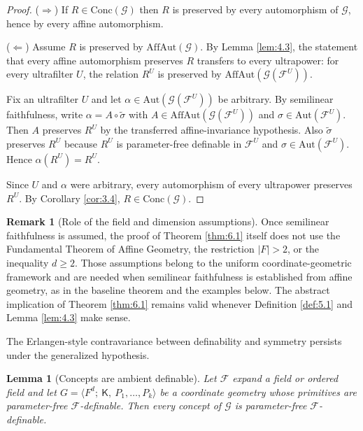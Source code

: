 \documentclass[11pt,a4paper]{article}
\newcommand{\G}{\mathcal{G}}
\newcommand{\F}{\mathcal{F}}
\newtheorem{lemma}[theorem]{Lemma}
\theoremstyle{definition}
\newtheorem{remark}[theorem]{Remark}
\begin{document}
\begin{proof}
($\Rightarrow$) If $R\in \mathrm{Conc}(\G)$ then $R$
is preserved by every automorphism of $\G$, hence by every affine
automorphism.

($\Leftarrow$) Assume $R$ is preserved by $\mathrm{AffAut}(\G)$. By
Lemma \ref{lem:4.3}, the statement that every affine automorphism preserves $R$
transfers to every ultrapower: for every ultrafilter $U$, the relation
$R^U$ is preserved by $\mathrm{AffAut}(\G(\F^U))$.

Fix an ultrafilter $U$ and let
$\alpha\in \mathrm{Aut}(\G(\F^U))$ be arbitrary. By semilinear
faithfulness, write $\alpha=A\circ \widetilde\sigma$ with
$A\in \mathrm{AffAut}(\G(\F^U))$ and
$\sigma\in \mathrm{Aut}(\F^U)$. Then $A$ preserves $R^U$
by the transferred affine-invariance hypothesis. Also
$\widetilde\sigma$ preserves $R^U$ because $R^U$ is parameter-free
definable in $\F^U$ and
$\sigma\in \mathrm{Aut}(\F^U)$. Hence $\alpha(R^U)=R^U$.

Since $U$ and $\alpha$ were arbitrary, every automorphism of every
ultrapower preserves $R^U$. By Corollary \ref{cor:3.4},
$R\in \mathrm{Conc}(\G)$.
\end{proof}


\begin{remark}[Role of the field and dimension assumptions]
	\label{rem:6.2}
Once
semilinear faithfulness is assumed, the proof of Theorem \ref{thm:6.1} itself does
not use the Fundamental Theorem of Affine Geometry, the restriction
$|F|>2$, or the inequality $d\ge 2$. Those assumptions belong to the
uniform coordinate-geometric framework and are needed when semilinear
faithfulness is established from affine geometry, as in the baseline
theorem and the examples below. The abstract implication of Theorem \ref{thm:6.1}
remains valid whenever Definition \ref{def:5.1} and Lemma \ref{lem:4.3} make sense.
\end{remark}


\label{sec:7}

The Erlangen-style contravariance between definability and symmetry
persists under the generalized hypothesis.

\begin{lemma}[Concepts are ambient definable]
	\label{lem:7.1}
Let $\F$
expand a field or ordered field and let
$G=\langle F^d;\ \mathsf K,\ P_1,\dots,P_k\rangle$ be a coordinate
geometry whose primitives are parameter-free $\F$-definable.
Then every concept of $\G$ is parameter-free $\F$-definable.
\end{lemma}
\end{document}
